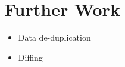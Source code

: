 \chapter{Further Work}

\begin{itemize}
    \item Data de-duplication
    \item Diffing
\end{itemize}
